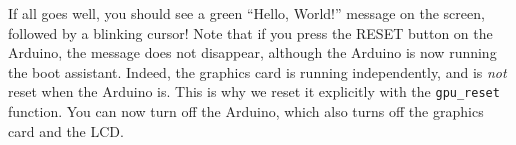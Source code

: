 If all goes well, you should see a green ``Hello, World!'' message on the
screen, followed by a blinking cursor! Note that if you press the RESET button
on the Arduino, the message does not disappear, although the Arduino is now
running the boot assistant. Indeed, the graphics card is running independently,
and is {\em not} reset when the Arduino is. This is why we reset it explicitly
with the \verb!gpu_reset! function. You can now turn off the Arduino, which
also turns off the graphics card and the LCD.

